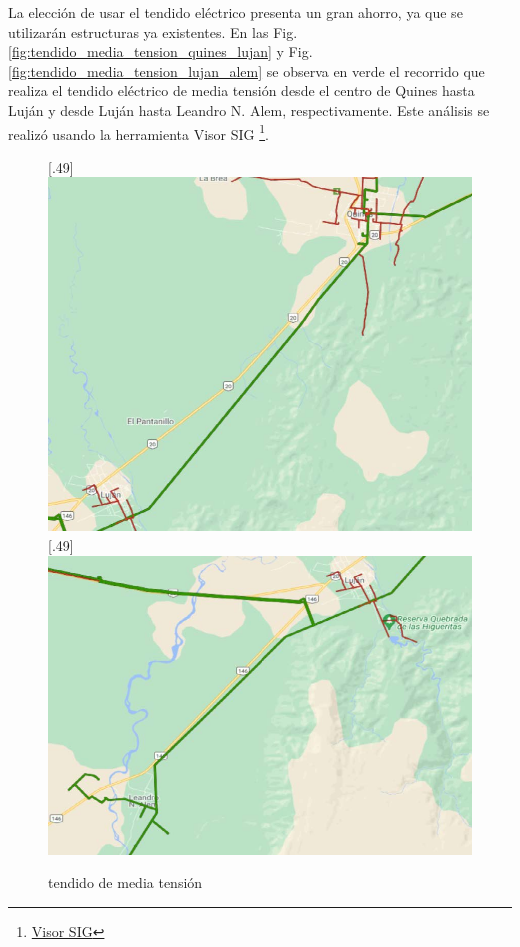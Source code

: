 \documentclass[11pt,a4paper]{article}
\begin{document}
La elección de usar el tendido eléctrico presenta un gran ahorro, ya que se utilizarán estructuras ya existentes. 
En las Fig. \ref{fig:tendido_media_tension_quines_lujan} y Fig. \ref{fig:tendido_media_tension_lujan_alem} se observa en verde el recorrido que realiza el tendido eléctrico de media tensión desde el centro de Quines hasta Luján y desde Luján hasta Leandro N. Alem, respectivamente.
Este análisis se realizó usando la herramienta Visor SIG \footnote{\href{https://sig.se.gob.ar/visor/visorsig.php?t=1}{Visor SIG}}.


\begin{figure}[ht!]
  \centering
  [.49\linewidth]{\includegraphics[height=11\baselineskip]{fotos_ema/tendido_media_tension_quines_lujan.jpg}}
  \hfill
  [.49\linewidth]{\includegraphics[height=11\baselineskip]{fotos_ema/tendido_media_tension_lujan_alem.jpg}}
  \caption{tendido de media tensión}
  \label{fig:tendido_media_tension}
\end{figure}
\end{document}
